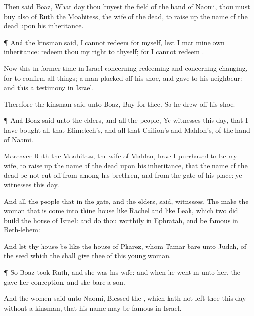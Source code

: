 {Then
said
Boaz, What
day thou
buyest the
field of the
hand of
Naomi, thou must
buy
{} also of
Ruth the
Moabitess, the
wife of the
dead, to raise
up the
name of the
dead upon his
inheritance.


\par }{\PP {}¶ And the
kinsman
said, I
cannot
redeem
{} for myself, lest I
mar mine own
inheritance:
redeem thou my
right to thyself; for I
cannot
redeem
{}.

Now this
{} in former
time in
Israel concerning
redeeming and concerning
changing, for to
confirm all
things; a
man plucked
off his
shoe, and
gave
{} to his
neighbour: and this
{} a
testimony in
Israel.

Therefore the
kinsman
said unto
Boaz,
Buy
{} for thee. So he drew
off his
shoe.


\par }{\PP {}¶ And
Boaz
said unto the
elders, and
{} all the
people, Ye
{}
witnesses this
day, that I have
bought all that
{}
Elimelech’s, and all that
{}
Chilion’s and
Mahlon’s, of the
hand of
Naomi.

Moreover
Ruth the
Moabitess, the
wife of
Mahlon, have I
purchased to be my
wife, to raise
up the
name of the
dead upon his
inheritance, that the
name of the
dead be not cut
off from
among his
brethren, and from the
gate of his
place: ye
{}
witnesses this
day.

And all the
people that
{} in the
gate, and the
elders,
said,
{}
witnesses. The
{}
make the
woman that is
come into thine
house like
Rachel and like
Leah, which
two did
build the
house of
Israel: and
do thou
worthily in
Ephratah, and be
famous in
Beth-lehem:

And let thy
house be like the
house of
Pharez, whom
Tamar
bare unto
Judah, of the
seed which the
{} shall
give thee of this young
woman.


\par }{\PP {}¶ So
Boaz
took
Ruth, and she was his
wife: and when he went
in unto her, the
{}
gave her
conception, and she
bare a
son.

And the
women
said unto
Naomi,
Blessed
{} the
{}, which hath not
left thee this
day without a
kinsman, that his
name may be
famous in
Israel.

}
